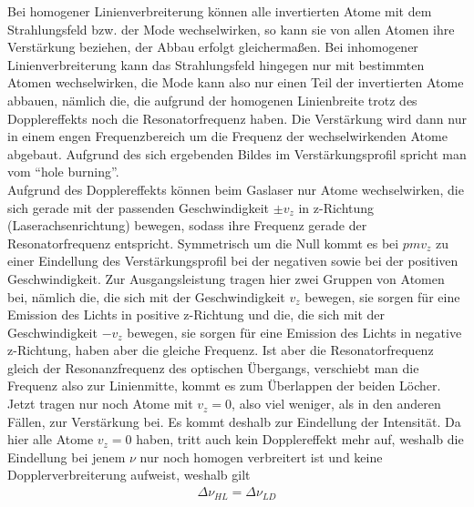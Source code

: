 \documentclass[a4paper,twoside,final]{article}
\begin{document}
Bei homogener Linienverbreiterung können alle invertierten Atome mit dem Strahlungsfeld bzw. der Mode wechselwirken, so kann sie von allen Atomen ihre Verstärkung beziehen, der Abbau erfolgt gleichermaßen. Bei inhomogener Linienverbreiterung kann das Strahlungsfeld hingegen nur mit bestimmten Atomen wechselwirken, die Mode kann also nur einen Teil der invertierten Atome abbauen, nämlich die, die aufgrund der homogenen Linienbreite trotz des Dopplereffekts noch die Resonatorfrequenz haben. Die Verstärkung wird dann nur in einem engen Frequenzbereich um die Frequenz der wechselwirkenden Atome abgebaut. Aufgrund des sich ergebenden Bildes im Verstärkungsprofil spricht man vom ``hole burning''. \\
Aufgrund des Dopplereffekts können beim Gaslaser nur Atome wechselwirken, die sich gerade mit der passenden Geschwindigkeit $\pm v_z$ in z-Richtung (Laserachsenrichtung) bewegen, sodass ihre Frequenz gerade der Resonatorfrequenz entspricht.  Symmetrisch um die Null kommt es bei $pm v_z$ zu einer Eindellung des Verstärkungsprofil bei der negativen sowie bei der positiven Geschwindigkeit. Zur Ausgangsleistung tragen hier zwei Gruppen von Atomen bei, nämlich die, die sich mit der Geschwindigkeit $v_z$ bewegen, sie sorgen für eine Emission des Lichts in positive z-Richtung und die, die sich mit der Geschwindigkeit $-v_z$ bewegen, sie sorgen für eine Emission des Lichts in negative z-Richtung, haben aber die gleiche Frequenz. Ist aber die Resonatorfrequenz gleich der Resonanzfrequenz des optischen Übergangs, verschiebt man die Frequenz also zur Linienmitte, kommt es zum Überlappen der beiden Löcher. Jetzt tragen nur noch Atome mit $v_z = 0$, also viel weniger, als in den anderen Fällen, zur Verstärkung bei. Es kommt deshalb zur Eindellung der Intensität. Da hier alle Atome $v_z = 0 $ haben, tritt auch kein Dopplereffekt mehr auf, weshalb die Eindellung bei jenem $\nu$ nur noch homogen verbreitert ist und keine Dopplerverbreiterung aufweist, weshalb gilt
\begin{align}
  \Delta \nu_{HL} = \Delta \nu_{LD}
\end{align}
\end{document}
